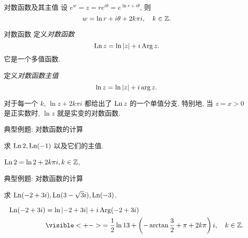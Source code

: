 \begin{frame}{对数函数及其主值}
\onslide<+->
设 $e^w=z=re^{i\theta}=e^{\ln r+i\theta}$,
\onslide<+->
则
\[w=\ln r+i\theta+2k\pi i,\quad k\in{\mathbb{Z}}.\]
\onslide<+->
\begin{alertblock}{对数函数}
 定义\emph{对数函数}
\[\operatorname{Ln} z=\ln\left|z\right|+i\operatorname{Arg} z.\]
它是一个多值函数.

 定义\emph{对数函数主值}
\[\ln z=\ln\left|z\right|+i\arg z.\]
\end{alertblock}
\onslide<+->
对于每一个 $k$, $\ln z+2k\pi i$ 都给出了 $\operatorname{Ln} z$ 的一个单值分支.
\onslide<+->
特别地, 当 $z=x>0$ 是正实数时, $\ln z$ 就是实变的对数函数.
\end{frame}


\begin{frame}{典型例题: 对数函数的计算}
\onslide<+->
\begin{example}
求 $\operatorname{Ln} 2,\operatorname{Ln}(-1)$ 以及它们的主值.
\end{example}
\onslide<+->
\begin{solution}
$\operatorname{Ln}2=\ln2+2k\pi i, k\in{\mathbb{Z}}$,

\end{solution}
\end{frame}


\begin{frame}{典型例题: 对数函数的计算}
\onslide<+->
\begin{example}
求 $\operatorname{Ln}(-2+3i),\operatorname{Ln}(3-\sqrt3 i),\operatorname{Ln}(-3)$.
\end{example}
\onslide<+->
\begin{solution}
\vspace{-0.5\baselineskip}
\begin{align*}
\Ln(-2+3i)&=\ln\abs{-2+3i}+i\Arg(-2+3i)\\
&\visible<+->{=\frac 12\ln 13+\left(-\arctan\frac 32+\pi+2k\pi\right)i,\quad k\in\BZ.}
\end{align*}
\vspace{-\baselineskip}
\vspace{-\baselineskip}
\onslide<+->{
\[\Ln(-3)=\ln(-3)+i\Arg(-3)
\visible<+->{=\ln3+(2k+1)\pi i,\quad k\in\BZ.}\]}
\vspace{-1\baselineskip}
\end{solution}
\end{frame}



